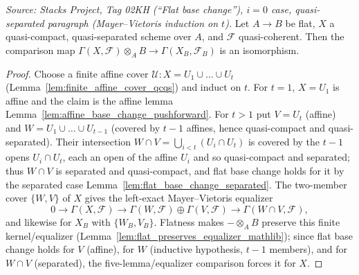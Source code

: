 \begin{lemma}
  \label{lem:flat_base_change_mayer_vietoris}
  \textit{Source: Stacks Project, Tag 02KH (``Flat base change''), $i=0$ case,
  quasi-separated paragraph (Mayer--Vietoris induction on \(t\)).}
  Let \(A \to B\) be flat, \(X\) a quasi-compact, quasi-separated scheme over \(A\),
  and \(\mathcal{F}\) quasi-coherent. Then the comparison map
  \(\Gamma(X,\mathcal{F}) \otimes_A B \to \Gamma(X_B,\mathcal{F}_B)\) is an
  isomorphism.
  \begin{proof}
    Choose a finite affine cover \(\mathcal{U} : X = U_1 \cup \dots \cup U_t\)
    (Lemma~\ref{lem:finite_affine_cover_qcqs}) and induct on \(t\). For \(t = 1\),
    \(X = U_1\) is affine and the claim is the affine lemma
    Lemma~\ref{lem:affine_base_change_pushforward}. For \(t > 1\) put \(V = U_t\)
    (affine) and \(W = U_1 \cup \dots \cup U_{t-1}\) (covered by \(t-1\) affines, hence
    quasi-compact and quasi-separated). Their intersection \(W \cap V =
    \bigcup_{i<t}(U_i \cap U_t)\) is covered by the \(t-1\) opens \(U_i \cap U_t\), each
    an open of the affine \(U_i\) and so quasi-compact and separated; thus \(W \cap V\)
    is separated and quasi-compact, and flat base change holds for it by the separated
    case Lemma~\ref{lem:flat_base_change_separated}. The two-member cover
    \(\{W, V\}\) of \(X\) gives the left-exact Mayer--Vietoris equalizer
    \[
      0 \to \Gamma(X,\mathcal{F}) \to
        \Gamma(W,\mathcal{F}) \oplus \Gamma(V,\mathcal{F}) \to \Gamma(W\cap V,\mathcal{F}),
    \]
    and likewise for \(X_B\) with \(\{W_B, V_B\}\). Flatness makes \(- \otimes_A B\)
    preserve this finite kernel/equalizer
    (Lemma~\ref{lem:flat_preserves_equalizer_mathlib}); since flat base change holds for
    \(V\) (affine), for \(W\) (inductive hypothesis, \(t-1\) members), and for
    \(W \cap V\) (separated), the five-lemma/equalizer comparison forces it for \(X\).
  \end{proof}
\end{lemma}

